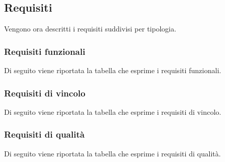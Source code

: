 \newpage
\subsection{Requisiti}
Vengono ora descritti i requisiti suddivisi per tipologia.

\subsubsection{Requisiti funzionali}
Di seguito viene riportata la tabella che esprime i requisiti funzionali.


\subsubsection{Requisiti di vincolo}
Di seguito viene riportata la tabella che esprime i requisiti di vincolo.


%

\subsubsection{Requisiti di qualità}
Di seguito viene riportata la tabella che esprime i requisiti di qualità.
